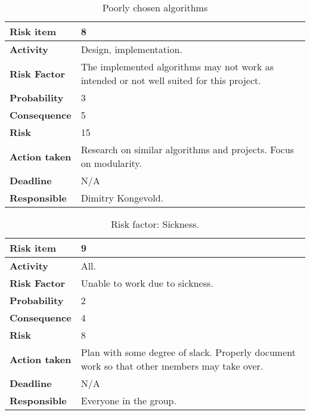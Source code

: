 \begin{table}[h!]
\begin{center}
\begin{tabularx}{\textwidth}{| X | X |}
\hline
\textbf{Risk item} & 8 \\
\hline
\textbf{Activity} & Design, implementation.  \\
\hline
\textbf{Risk Factor} & The implemented algorithms may not work as intended or not well suited for this project.\\
\hline
\textbf{Probability} & 3 \\
\hline
\textbf{Consequence} & 5 \\
\hline
\textbf{Risk} & 15 \\
\hline
\textbf{Action taken} & Research on similar algorithms and
projects. Focus on modularity. \\
\hline
\textbf{Deadline} & N/A \\
\hline
\textbf{Responsible} & Dimitry Kongevold. \\
\hline
\end{tabularx}
\caption{Poorly chosen algorithms}
\end{center}
\label{risk_2}
\end{table}




\begin{table}[h!]
\begin{center}
\begin{tabularx}{\textwidth}{| X | X |}
\hline
\textbf{Risk item} & 9 \\
\hline
\textbf{Activity} & All. \\
\hline
\textbf{Risk Factor} & Unable to work due to sickness. \\
\hline
\textbf{Probability} & 2 \\
\hline
\textbf{Consequence} & 4 \\
\hline
\textbf{Risk} & 8 \\
\hline
\textbf{Action taken} & Plan with some degree of slack. \newline Properly document work so that other members may take over. \\
\hline
\textbf{Deadline} & N/A \\
\hline
\textbf{Responsible} & Everyone in the group.\\
\hline
\end{tabularx}
\caption{Risk factor: Sickness.}
\end{center}
\label{risk_6}
\end{table}
